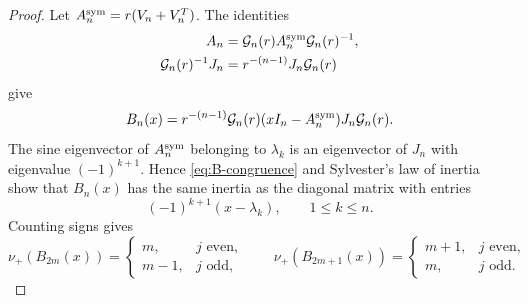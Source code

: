 \documentclass[10pt,twoside]{siamart1116}
\numberwithin{equation}{section}
\begin{document}
\begin{proof}
Let \(A_n^{\rm sym}=r(V_n+V_n^T)\).  The identities
\[
 \begin{aligned}
 A_n&=\mathcal G_n(r)A_n^{\rm sym}\mathcal G_n(r)^{-1},\\
 \mathcal G_n(r)^{-1}J_n
 &=r^{-(n-1)}J_n\mathcal G_n(r)
 \end{aligned}
\]
give
\begin{equation}\label{eq:B-congruence}
 B_n(x)=r^{-(n-1)}\mathcal G_n(r)(xI_n-A_n^{\rm sym})
 J_n\mathcal G_n(r).
\end{equation}
The sine eigenvector of \(A_n^{\rm sym}\) belonging to \(\lambda_k\) is an
eigenvector of \(J_n\) with eigenvalue \((-1)^{k+1}\).  Hence
\eqref{eq:B-congruence} and Sylvester's law of inertia show that
\(B_n(x)\) has the same inertia as the diagonal matrix with entries
\[
 (-1)^{k+1}(x-\lambda_k),\qquad 1\leq k\leq n.
\]
Counting signs gives
\begin{equation}\label{eq:middle-inertia}
 \nu_+(B_{2m}(x))=
 \begin{cases}m,&j\text{ even},\\m-1,&j\text{ odd},\end{cases}
 \qquad
 \nu_+(B_{2m+1}(x))=
 \begin{cases}m+1,&j\text{ even},\\m,&j\text{ odd}.
 \end{cases}
\end{equation}


\end{proof}
\end{document}
